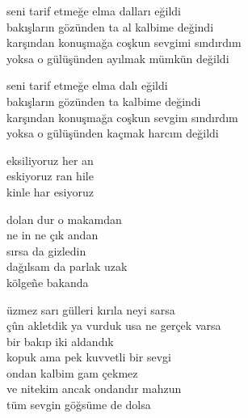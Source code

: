 \documentclass[10pt, openright, oneside]{memoir}
\theoremstyle{definition}
\begin{document}
\settowidth{\versewidth}{karşından konuşmağa coşkun sevgimi sındırdım}
\begin{cverse}
  seni tarif etmeğe elma dalları eğildi \\
  bakışların gözünden ta al kalbime değindi \\
  karşından konuşmağa coşkun sevgimi sındırdım \\
  yoksa o gülüşünden ayılmak mümkün değildi

  seni tarif etmeğe elma dalı eğildi \\
  bakışların gözünden ta kalbime değindi \\
  karşından konuşmağa coşkun sevgim sındırdım \\
  yoksa o gülüşünden kaçmak harcım değildi \\
\end{cverse}
\vspace*{\fill}
%
\newpage
{}
\vspace*{\fill}
\settowidth{\versewidth}{eksiliyoruz her an}
\begin{cverse}
  eksiliyoruz her an \\
  eskiyoruz ran hile \\
  kinle har esiyoruz
\end{cverse}
\vspace*{\fill}
%
\newpage
{}
\vspace*{\fill}
\settowidth{\versewidth}{çûn akletdik ya vurduk usa ne gerçek varsa}
\begin{cverse}
  dolan dur o makamdan \\
  ne in ne çık andan \\
  sırsa da gizledin \\
  dağılsam da parlak uzak \\
  kölge\~ne bakanda

  üzmez sarı gülleri kırıla neyi sarsa \\
  çûn akletdik ya vurduk usa ne gerçek varsa \\
  bir bakıp iki aldandık \\
  kopuk ama pek kuvvetli bir sevgi \\
  ondan kalbim gam çekmez \\
  ve nitekim ancak ondandır mahzun \\
  tüm sevgin göğsüme de dolsa \\
\end{cverse}
\end{document}
